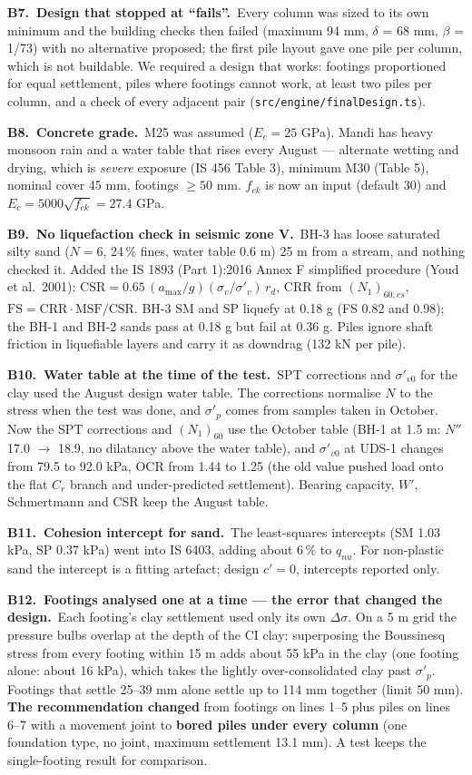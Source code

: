 \documentclass[11pt,a4paper]{article}
\newcommand{\code}[1]{\texttt{\small #1}}
\newcommand{\auditem}[3]{\par\medskip\textbf{\color{accent}#1.\ #2.}\ #3\par}
\begin{document}
\auditem{B7}{Design that stopped at ``fails''}{Every column was sized to its own minimum and the building checks then
failed (maximum 94 mm, $\delta$ = 68 mm, $\beta$ = 1/73) with no alternative proposed; the first pile layout gave one
pile per column, which is not buildable. We required a design that works: footings proportioned for equal settlement,
piles where footings cannot work, at least two piles per column, and a check of every adjacent pair
(\code{src/engine/finalDesign.ts}).}

\auditem{B8}{Concrete grade}{M25 was assumed ($E_c = 25$ GPa). Mandi has heavy monsoon rain and a water table that
rises every August --- alternate wetting and drying, which is \emph{severe} exposure (IS 456 Table 3), minimum M30
(Table 5), nominal cover 45 mm, footings $\ge 50$ mm. $f_{ck}$ is now an input (default 30) and
$E_c = 5000\sqrt{f_{ck}} = 27.4$ GPa.}

\auditem{B9}{No liquefaction check in seismic zone V}{BH-3 has loose saturated silty sand ($N = 6$, 24\,\% fines, water
table 0.6 m) 25 m from a stream, and nothing checked it. Added the IS 1893 (Part 1):2016 Annex F simplified procedure
(Youd et al.\ 2001): $\text{CSR} = 0.65\,(a_\text{max}/g)(\sigma_v/\sigma'_v)\,r_d$, CRR from $(N_1)_{60,cs}$,
$\text{FS} = \text{CRR}\cdot\text{MSF}/\text{CSR}$. BH-3 SM and SP liquefy at 0.18 g (FS 0.82 and 0.98); the BH-1 and
BH-2 sands pass at 0.18 g but fail at 0.36 g. Piles ignore shaft friction in liquefiable layers and carry it as
downdrag (132 kN per pile).}

\auditem{B10}{Water table at the time of the test}{SPT corrections and $\sigma'_{v0}$ for the clay used the August
design water table. The corrections normalise $N$ to the stress when the test was done, and $\sigma'_p$ comes from
samples taken in October. Now the SPT corrections and $(N_1)_{60}$ use the October table (BH-1 at 1.5 m:
$N''$ 17.0 $\rightarrow$ 18.9, no dilatancy above the water table), and $\sigma'_{v0}$ at UDS-1 changes from 79.5 to
92.0 kPa, OCR from 1.44 to 1.25 (the old value pushed load onto the flat $C_r$ branch and under-predicted settlement).
Bearing capacity, $W'$, Schmertmann and CSR keep the August table.}

\auditem{B11}{Cohesion intercept for sand}{The least-squares intercepts (SM 1.03 kPa, SP 0.37 kPa) went into IS 6403,
adding about 6\,\% to $q_{nu}$. For non-plastic sand the intercept is a fitting artefact; design $c' = 0$, intercepts
reported only.}

\auditem{B12}{Footings analysed one at a time --- the error that changed the design}{Each footing's clay settlement used
only its own $\Delta\sigma$. On a 5 m grid the pressure bulbs overlap at the depth of the CI clay: superposing the
Boussinesq stress from every footing within 15 m adds about 55 kPa in the clay (one footing alone: about 16 kPa), which
takes the lightly over-consolidated clay past $\sigma'_p$. Footings that settle 25--39 mm alone settle up to 114 mm
together (limit 50 mm). \textbf{The recommendation changed} from footings on lines 1--5 plus piles on lines 6--7 with a
movement joint to \textbf{bored piles under every column} (one foundation type, no joint, maximum settlement 13.1 mm).
A test keeps the single-footing result for comparison.}
\end{document}

